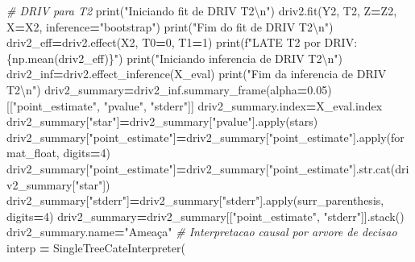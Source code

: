 \documentclass[
]{article}
\newenvironment{Shaded}{\begin{snugshade}}{\end{snugshade}}
\newcommand{\BuiltInTok}[1]{#1}
\newcommand{\CharTok}[1]{\textcolor[rgb]{0.31,0.60,0.02}{#1}}
\newcommand{\CommentTok}[1]{\textcolor[rgb]{0.56,0.35,0.01}{\textit{#1}}}
\newcommand{\DecValTok}[1]{\textcolor[rgb]{0.00,0.00,0.81}{#1}}
\newcommand{\FloatTok}[1]{\textcolor[rgb]{0.00,0.00,0.81}{#1}}
\newcommand{\NormalTok}[1]{#1}
\newcommand{\OperatorTok}[1]{\textcolor[rgb]{0.81,0.36,0.00}{\textbf{#1}}}
\newcommand{\SpecialCharTok}[1]{\textcolor[rgb]{0.00,0.00,0.00}{#1}}
\newcommand{\SpecialStringTok}[1]{\textcolor[rgb]{0.31,0.60,0.02}{#1}}
\newcommand{\StringTok}[1]{\textcolor[rgb]{0.31,0.60,0.02}{#1}}
\begin{document}
\begin{Shaded}
\begin{Highlighting}[]
{{\CommentTok{# DRIV para T2}
\BuiltInTok{print}\NormalTok{(}\StringTok{"Iniciando fit de DRIV T2}\CharTok{\textbackslash{}n}\StringTok{"}\NormalTok{)}
\NormalTok{driv2.fit(Y2, T2, Z}\OperatorTok{=}\NormalTok{Z2, X}\OperatorTok{=}\NormalTok{X2, inference}\OperatorTok{=}\StringTok{"bootstrap"}\NormalTok{)}
\BuiltInTok{print}\NormalTok{(}\StringTok{"Fim do fit de DRIV T2}\CharTok{\textbackslash{}n}\StringTok{"}\NormalTok{)}
\NormalTok{driv2_eff}\OperatorTok{=}\NormalTok{driv2.effect(X2, T0}\OperatorTok{=}\DecValTok{0}\NormalTok{, T1}\OperatorTok{=}\DecValTok{1}\NormalTok{)}
\BuiltInTok{print}\NormalTok{(}\SpecialStringTok{f"LATE T2 por DRIV: }\SpecialCharTok{\{np.}\NormalTok{mean(driv2_eff)}\SpecialCharTok{\}}\SpecialStringTok{"}\NormalTok{)}
\BuiltInTok{print}\NormalTok{(}\StringTok{"Iniciando inferencia de DRIV T2}\CharTok{\textbackslash{}n}\StringTok{"}\NormalTok{)}
\NormalTok{driv2_inf}\OperatorTok{=}\NormalTok{driv2.effect_inference(X_eval)}
\BuiltInTok{print}\NormalTok{(}\StringTok{"Fim da inferencia de DRIV T2}\CharTok{\textbackslash{}n}\StringTok{"}\NormalTok{)}
\NormalTok{driv2_summary}\OperatorTok{=}\NormalTok{driv2_inf.summary_frame(alpha}\OperatorTok{=}\FloatTok{0.05}\NormalTok{)[[}\StringTok{"point_estimate"}\NormalTok{, }\StringTok{"pvalue"}\NormalTok{, }\StringTok{"stderr"}\NormalTok{]]}
\NormalTok{driv2_summary.index}\OperatorTok{=}\NormalTok{X_eval.index}
\NormalTok{driv2_summary[}\StringTok{"star"}\NormalTok{]}\OperatorTok{=}\NormalTok{driv2_summary[}\StringTok{"pvalue"}\NormalTok{].}\BuiltInTok{apply}\NormalTok{(stars)}
\NormalTok{driv2_summary[}\StringTok{"point_estimate"}\NormalTok{]}\OperatorTok{=}\NormalTok{driv2_summary[}\StringTok{"point_estimate"}\NormalTok{].}\BuiltInTok{apply}\NormalTok{(format_float, digits}\OperatorTok{=}\DecValTok{4}\NormalTok{)}
\NormalTok{driv2_summary[}\StringTok{"point_estimate"}\NormalTok{]}\OperatorTok{=}\NormalTok{driv2_summary[}\StringTok{"point_estimate"}\NormalTok{].}\BuiltInTok{str}\NormalTok{.cat(driv2_summary[}\StringTok{"star"}\NormalTok{])}
\NormalTok{driv2_summary[}\StringTok{"stderr"}\NormalTok{]}\OperatorTok{=}\NormalTok{driv2_summary[}\StringTok{"stderr"}\NormalTok{].}\BuiltInTok{apply}\NormalTok{(surr_parenthesis, digits}\OperatorTok{=}\DecValTok{4}\NormalTok{)}
\NormalTok{driv2_summary}\OperatorTok{=}\NormalTok{driv2_summary[[}\StringTok{"point_estimate"}\NormalTok{, }\StringTok{"stderr"}\NormalTok{]].stack()}
\NormalTok{driv2_summary.name}\OperatorTok{=}\StringTok{"Ameaça"}
\CommentTok{# Interpretacao causal por arvore de decisao}
\NormalTok{interp }\OperatorTok{=}\NormalTok{ SingleTreeCateInterpreter(}
}}
\end{Highlighting}
\end{Shaded}
\end{document}
